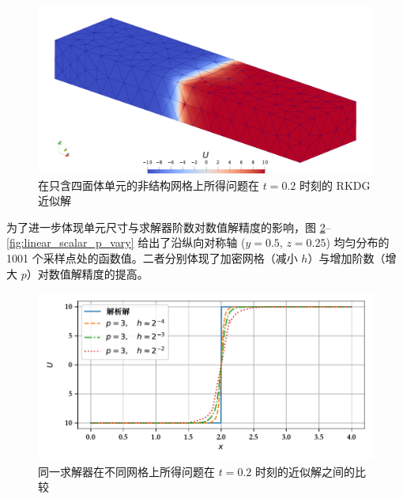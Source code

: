 \begin{figure}[h!]
\begin{centering}
{\begin{centering}
\includegraphics[width=1\textwidth,height=0.4\textheight,keepaspectratio]{../mdpi/figures/linear_scalar/p=3_h=2^-2}
\par\end{centering}
}
\par\end{centering}
\centering{}\caption{\label{fig:linear_scalar_contour}在只含四面体单元的非结构网格上所得问题在
$t=0.2$ 时刻的 RKDG 近似解}
\end{figure}

为了进一步体现单元尺寸与求解器阶数对数值解精度的影响，图 \ref{fig:linear_scalar_h_vary}–\ref{fig:linear_scalar_p_vary}
给出了沿纵向对称轴 ($y=0.5,\,z=0.25$) 均匀分布的 1001 个采样点处的函数值。二者分别体现了加密网格（减小
$h$）与增加阶数（增大 $p$）对数值解精度的提高。

\begin{figure}[h!]
\begin{centering}
\includegraphics[width=1\textwidth,height=0.3\textheight,keepaspectratio]{figures/linear_scalar/h_vary}
\par\end{centering}
\caption{\label{fig:linear_scalar_h_vary}同一求解器在不同网格上所得问题在
$t=0.2$ 时刻的近似解之间的比较}
\end{figure}


